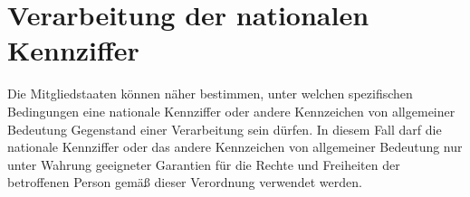 \chapter{Verarbeitung der nationalen Kennziffer}
\label{ch:87}


Die Mitgliedstaaten können näher bestimmen, unter welchen spezifischen Bedingungen eine nationale Kennziffer oder andere
Kennzeichen von allgemeiner Bedeutung Gegenstand einer Verarbeitung sein dürfen. In diesem Fall darf die nationale
Kennziffer oder das andere Kennzeichen von allgemeiner Bedeutung nur unter Wahrung geeigneter Garantien für die Rechte
und Freiheiten der betroffenen Person gemäß dieser Verordnung verwendet werden.


